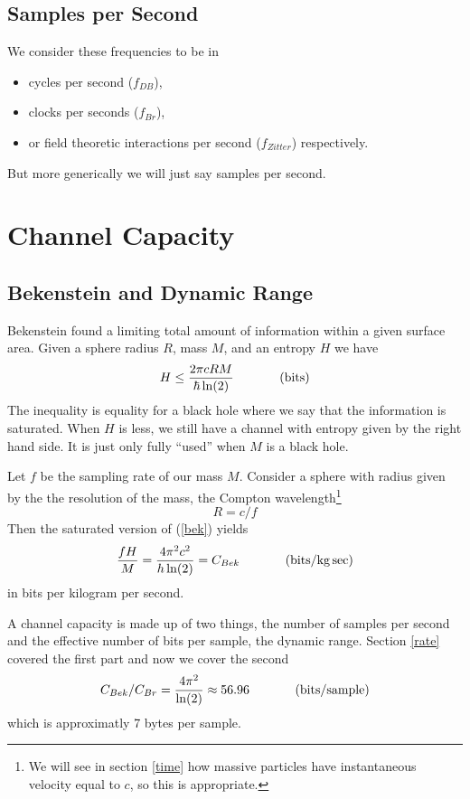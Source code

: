 \documentclass[12pt,a4paper]{article}
\begin{document}
\subsection{Samples per Second}
We consider these frequencies to be in
\begin{itemize}
 \item cycles per second ($f_{DB}$),
 \item clocks per seconds ($f_{Br}$),
 \item or field theoretic interactions per second ($f_{Zitter}$) respectively.
\end{itemize}
But more generically we will just say samples per second. 

\section{Channel Capacity}
\subsection{Bekenstein and Dynamic Range}
Bekenstein found a limiting total amount of information within a given surface area.  Given a sphere radius $R$,  mass $M$, and an entropy $H$ we have
\begin{equation}
\label{bek}
  H \le \frac{2 \pi c R M}{\hbar \ln(2)} \hspace{0.5 in} (\si[per-mode=symbol]{bits})
\end{equation}
The inequality is equality for a black hole where we say that the information is saturated.  When $H$ is less, we still have a channel with entropy given by the right hand side.  It is just only fully ``used'' when $M$ is a black hole.

Let $f$ be the sampling rate of our mass $M$.  Consider a sphere with radius given by the  the resolution of the mass, the Compton wavelength\footnote{We will see in section \ref{time} how massive particles have instantaneous velocity equal to $c$, so this is appropriate.}
\[
  R=c/f  
\]
Then the saturated version of (\ref{bek}) yields
\[
 \frac{fH}{M} = \frac{4 \pi^2 c^2}{h \ln(2)} = C_{Bek} \hspace{0.5 in} (\si[per-mode=symbol]{bits\per\kilogram.\sec})
\]
in bits per kilogram per second.

A channel capacity is made up of two things, the number of samples per second and the effective number of bits per sample, the dynamic range.  Section \ref{rate} covered the first part and now we cover the second
\begin{equation}
\label{cap}
   C_{Bek} / C_{Br} = \frac{4 \pi^2}{\ln(2)} \approx 56.96 \hspace{0.5 in} (\si[per-mode=symbol]{bits\per sample})
\end{equation}
which is approximatly 7 bytes per sample. 
\end{document}
